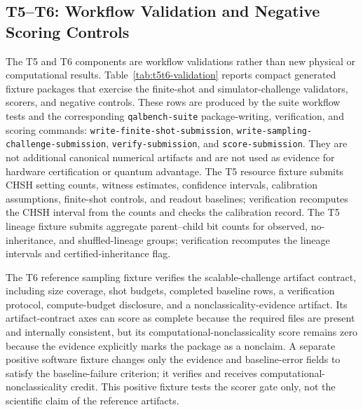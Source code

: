 \documentclass[11pt]{article}
\begin{document}
\FloatBarrier

\subsection{T5--T6: Workflow Validation and Negative Scoring Controls}

The T5 and T6 components are workflow validations rather than new physical or computational results. Table~\ref{tab:t5t6-validation} reports compact generated fixture packages that exercise the finite-shot and simulator-challenge validators, scorers, and negative controls. These rows are produced by the suite workflow tests and the corresponding \texttt{qalbench-suite} package-writing, verification, and scoring commands: \texttt{write-finite-shot-submission}, \texttt{write-sampling-challenge-submission}, \texttt{verify-submission}, and \texttt{score-submission}. They are not additional canonical numerical artifacts and are not used as evidence for hardware certification or quantum advantage. The T5 resource fixture submits CHSH setting counts, witness estimates, confidence intervals, calibration assumptions, finite-shot controls, and readout baselines; verification recomputes the CHSH interval from the counts and checks the calibration record. The T5 lineage fixture submits aggregate parent--child bit counts for observed, no-inheritance, and shuffled-lineage groups; verification recomputes the lineage intervals and certified-inheritance flag.

The T6 reference sampling fixture verifies the scalable-challenge artifact contract, including size coverage, shot budgets, completed baseline rows, a verification protocol, compute-budget disclosure, and a nonclassicality-evidence artifact. Its artifact-contract axes can score as complete because the required files are present and internally consistent, but its computational-nonclassicality score remains zero because the evidence explicitly marks the package as a nonclaim. A separate positive software fixture changes only the evidence and baseline-error fields to satisfy the baseline-failure criterion; it verifies and receives computational-nonclassicality credit. This positive fixture tests the scorer gate only, not the scientific claim of the reference artifacts.
\end{document}

